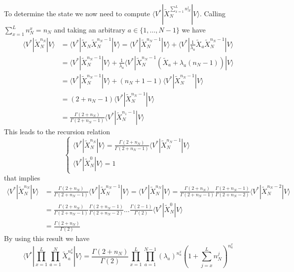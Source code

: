 \documentclass[10pt]{article}
\numberwithin{equation}{section}
\numberwithin{equation}{subsection}
\begin{document}
To determine the state we now need to compute $\langle V^{*}|\widetilde{X}_{N}^{\sum_{x=1}^{L}n_{N}^{l}}|V\rangle$. Calling $\sum_{x=1}^{L}n_{N}^{x}=n_{N}$ and taking an arbitrary $a\in \{1,\ldots,N-1\}$ we have
\begin{align*}
	\langle V^{*}|\widetilde{X}_{N}^{n_{N}}|V\rangle&=\langle V^{*}|\widetilde{X}_{N}\widetilde{X}_{N}^{n_{N}-1}|V\rangle=\langle V^{*}|\widetilde{X}_{N}^{n_{N}-1}|V\rangle +\langle V^{*}|\frac{1}{\lambda_{a}}\widetilde{X}_{a}\widetilde{X}_{N}^{n_{N}-1}|V\rangle
	\\&=
	\langle V^{*}|\widetilde{X}_{N}^{n_{N}-1}|V\rangle+\frac{1}{\lambda_{a}}\langle V^{*}|\widetilde{X}_{N}^{n_{N}-1}\left(\widetilde{X}_{a}+\lambda_{a}(n_{N}-1)\right)|V\rangle
	\\&=
	\langle V^{*}|\widetilde{X}_{N}^{n_{N}-1}|V\rangle+\left(n_{N}+1-1\right)\langle V^{*}|\widetilde{X}_{N}^{n_{N}-1}|V\rangle
	\\&=
	\left(2+n_{N}-1\right)\langle V^{*}|\widetilde{X}_{N}^{n_{N}-1}|V\rangle
	\\&=
	\frac{\Gamma(2+n_{N})}{\Gamma(2+n_{N}-1)}\langle V^{*}|\widetilde{X}_{N}^{n_{1}-1}|V\rangle
\end{align*}
This leads to the recursion relation
\begin{equation}
	\begin{cases}
		\langle V^{*}|\widetilde{X}_{N}^{n_{N}}|V\rangle=\frac{\Gamma(2+n_{N})}{\Gamma(2+n_{N}-1)}\langle V^{*}|\widetilde{X}_{N}^{n_{N}-1}|V\rangle\\
		\langle V^{*}|\widetilde{X}_{N}^{0}|V\rangle=1
	\end{cases}
\end{equation}
that implies 
\begin{align*}
	\langle V^{*}|\widetilde{X}_{N}^{n_{N}}|V\rangle&=\frac{\Gamma(2+n_{N})}{\Gamma(2+n_{N}-1)}\langle V^{*}|\widetilde{X}_{N}^{n_{N}-1}|V\rangle=\langle V^{*}|\widetilde{X}_{N}^{n_{N}}|V\rangle=\frac{\Gamma(2+n_{N})}{\Gamma(2+n_{N}-1)}\frac{\Gamma(2+n_{N}-1)}{\Gamma(2+n_{N}-2)}\langle V^{*}|\widetilde{X}_{N}^{n_{N}-2}|V\rangle\\&=
	\frac{\Gamma(2+n_{N})}{\Gamma(2+n_{N}-1)}\frac{\Gamma(2+n_{N}-1)}{\Gamma(2+n_{N}-2)}\ldots \frac{\Gamma(2-1)}{\Gamma(2)}\langle V^{*}|\widetilde{X}_{N}^{0}|V\rangle
	\\&=
	\frac{\Gamma(2+n_{N})}{\Gamma(2)}
\end{align*}
By using this result we have 
\begin{equation}
	\langle V^{*}|\prod_{x=1}^{L}\prod_{a=1}^{N}\widetilde{X}_{a}^{n_{a}^{x}}
	|V \rangle=\frac{\Gamma(2+n_{N})}{\Gamma(2)}\prod_{x=1}^{L}\prod_{a=1}^{N-1}\left(\lambda_{a}\right)^{n_{a}^{x}}\left(1+\sum_{j=x}^{L}n_{N}^{j}\right)^{n_{a}^{x}}
\end{equation}
\end{document}
